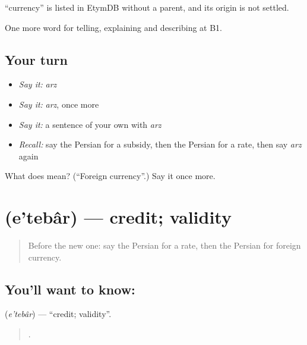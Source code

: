 \begin{cousinweb}
\textbf{} \textquotedblleft{}currency\textquotedblright{} is listed in EtymDB without a parent, and its origin is not settled.
\end{cousinweb}

\begin{grammarlens}[title={What you've built}]
One more word for telling, explaining and describing at B1.
\end{grammarlens}

\subsection*{Your turn}
\begin{itemize}
\raggedright
  \item \emph{Say it:} \emph{arz}
  \item \emph{Say it:} \emph{arz}, once more
  \item \emph{Say it:} a sentence of your own with \emph{arz}
  \item \emph{Recall:} say the Persian for a subsidy, then the Persian for a rate, then say \emph{arz} again
\end{itemize}

\begin{tcolorbox}[breakable,colback=teal!4,colframe=teal!35!black,title={Before you move on}]
What does  mean? (\textquotedblleft{}Foreign currency\textquotedblright{}.) Say it once more.
\end{tcolorbox}
\section[\texorpdfstring{\fa{اعتبار} (e'tebâr)}{اعتبار (e'tebâr)}]{ (e'tebâr) — credit; validity}

\label{lesson:FA-C414-etebar}



\begin{quote}
Before the new one: say the Persian for a rate, then the Persian for foreign currency.
\end{quote}

\subsection*{You'll want to know: }
\textbf{} (\emph{e'tebâr}) — \textquotedblleft{}credit; validity\textquotedblright{}.

\begin{quote}
      .
\end{quote}

